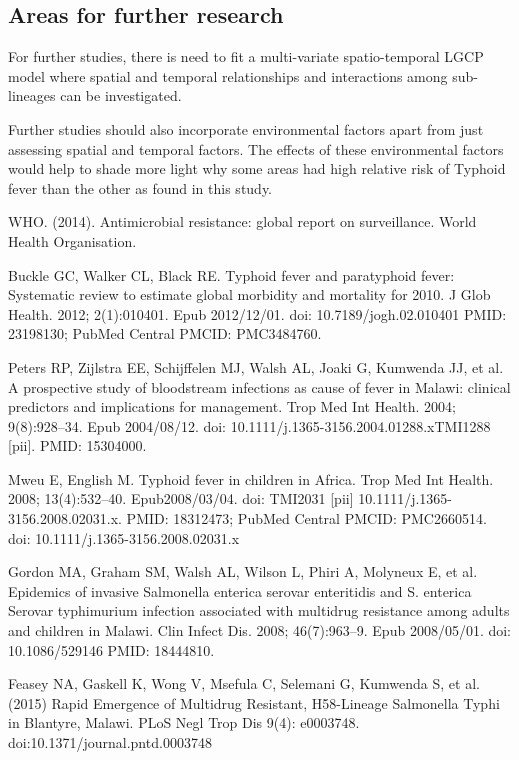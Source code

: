 \documentclass[a4paper]{thesis}
\begin{document}
\subsection{Areas for further research}

For further studies, there is need to fit a multi-variate spatio-temporal LGCP model where spatial and temporal relationships and interactions among sub-lineages can be investigated. 

Further studies should also incorporate environmental factors apart from just assessing spatial and temporal factors. The effects of these environmental factors would help to shade more light why some areas had high relative risk of Typhoid fever than the other as found in this study.

\begin{thebibliography}{99}

 WHO. (2014). Antimicrobial resistance: global report on surveillance. World Health Organisation.

 Buckle GC, Walker CL, Black RE. Typhoid fever and paratyphoid fever: Systematic review to estimate global morbidity and mortality for 2010. J Glob Health. 2012; 2(1):010401. Epub 2012/12/01. doi: 10.7189/jogh.02.010401 PMID: 23198130; PubMed Central PMCID: PMC3484760.

 Peters RP, Zijlstra EE, Schijffelen MJ, Walsh AL, Joaki G, Kumwenda JJ, et al. A prospective study of bloodstream infections as cause of fever in Malawi: clinical predictors and implications for management. Trop Med Int Health. 2004; 9(8):928–34. Epub 2004/08/12. doi: 10.1111/j.1365-3156.2004.01288.xTMI1288 [pii]. PMID: 15304000.

 Mweu E, English M. Typhoid fever in children in Africa. Trop Med Int Health. 2008; 13(4):532–40. Epub2008/03/04. doi: TMI2031 [pii] 10.1111/j.1365-3156.2008.02031.x. PMID: 18312473; PubMed Central PMCID: PMC2660514. doi: 10.1111/j.1365-3156.2008.02031.x

 Gordon MA, Graham SM, Walsh AL, Wilson L, Phiri A, Molyneux E, et al. Epidemics of invasive Salmonella enterica serovar enteritidis and S. enterica Serovar typhimurium infection associated with multidrug resistance among adults and children in Malawi. Clin Infect Dis. 2008; 46(7):963–9. Epub 2008/05/01. doi: 10.1086/529146 PMID: 18444810.

Feasey NA, Gaskell K, Wong V, Msefula C, Selemani G, Kumwenda S, et al. (2015) Rapid Emergence of Multidrug Resistant, H58-Lineage Salmonella Typhi in Blantyre, Malawi. PLoS Negl Trop Dis 9(4): e0003748. doi:10.1371/journal.pntd.0003748


\end{thebibliography}
\end{document}

